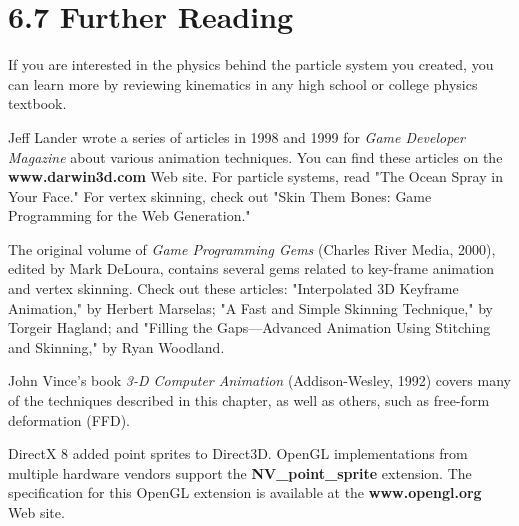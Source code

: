 \documentclass[../main.tex]{subfiles}
\begin{document}
\section{6.7 Further Reading}

If you are interested in the physics behind the particle system you created, you can learn more by reviewing kinematics in any high school or college physics textbook.

Jeff Lander wrote a series of articles in 1998 and 1999 for \textit{Game Developer Magazine} about various animation techniques. You can find these articles on the \textbf{www.darwin3d.com} Web site. For particle systems, read "The Ocean Spray in Your Face." For vertex skinning, check out "Skin Them Bones: Game Programming for the Web Generation."

The original volume of \textit{Game Programming Gems} (Charles River Media, 2000), edited by Mark DeLoura, contains several gems related to key-frame animation and vertex skinning. Check out these articles: "Interpolated 3D Keyframe Animation," by Herbert Marselas; "A Fast and Simple Skinning Technique," by Torgeir Hagland; and "Filling the Gaps—Advanced Animation Using Stitching and Skinning," by Ryan Woodland.

John Vince's book \textit{3-D Computer Animation} (Addison-Wesley, 1992) covers many of the techniques described in this chapter, as well as others, such as free-form deformation (FFD).

DirectX 8 added point sprites to Direct3D. OpenGL implementations from multiple hardware vendors support the \textbf{NV_point_sprite} extension. The specification for this OpenGL extension is available at the \textbf{www.opengl.org} Web site.
\end{document}
